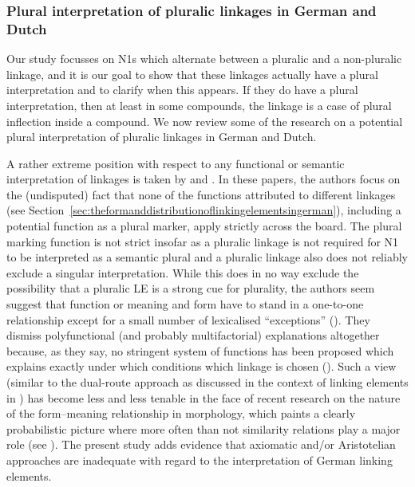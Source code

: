 \subsubsection{Plural interpretation of pluralic linkages in German and Dutch}

Our study focusses on N1s which alternate between a pluralic and a non-pluralic linkage, and it is our goal to show that these linkages actually have a plural interpretation and to clarify when this appears.
If they do have a plural interpretation, then at least in some compounds, the linkage is a case of plural inflection inside a compound.
We now review some of the research on a potential plural interpretation of pluralic linkages in German and Dutch.

A rather extreme position with respect to any functional or semantic interpretation of linkages is taken by \textcite{NeefBorgwaldt2012} and \textcite{Neef2015}.
In these papers, the authors focus on the (undisputed) fact that none of the functions attributed to different linkages (see Section~\ref{sec:theformanddistributionoflinkingelementsingerman}), including a potential function as a plural marker, apply strictly across the board.
The plural marking function is not strict insofar as a pluralic linkage is not required for N1 to be interpreted as a semantic plural and a pluralic linkage also does not reliably exclude a singular interpretation.
While this does in no way exclude the possibility that a pluralic LE is a strong cue for plurality, the authors seem suggest that function or meaning and form have to stand in a one-to-one relationship except for a small number of lexicalised ``exceptions'' (\egg \citealt[42]{NeefBorgwaldt2012}).
They dismiss polyfunctional (and probably multifactorial) explanations altogether because, as they say, no stringent system of functions has been proposed which explains exactly under which conditions which linkage is chosen (\egg \citealt[27--29]{NeefBorgwaldt2012}).
Such a view (similar to the dual-route approach as discussed in the context of linking elements in \citealt{KrottEa2007}) has become less and less tenable in the face of recent research on the nature of the form--meaning relationship in morphology, which paints a clearly probabilistic picture where more often than not similarity relations play a major role (see \citealt[107]{ArndtlappeEa2016}).
The present study adds evidence that axiomatic and\slash or Aristotelian approaches are inadequate with regard to the interpretation of German linking elements.

